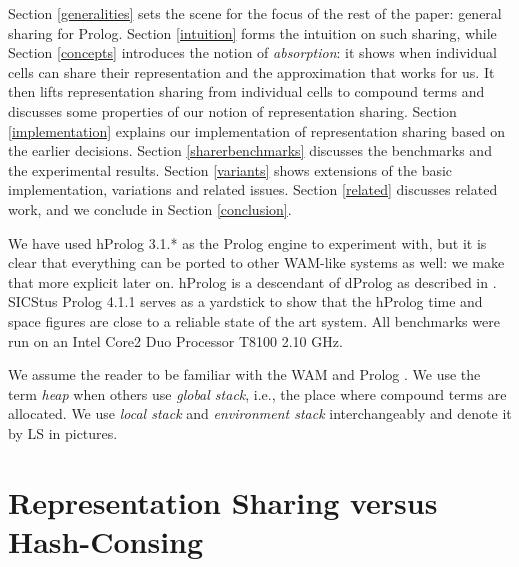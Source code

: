 \documentclass{tlp}
\begin{document}
Section \ref{generalities} sets the scene for the focus of the rest of
the paper: general sharing for Prolog. Section \ref{intuition}
forms the intuition on such sharing, while Section \ref{concepts}
introduces the notion of {\em absorption}: it shows when individual
cells can share their representation and the approximation that works
for us. It then lifts representation sharing from individual cells to
compound terms and discusses some properties of our notion of
representation sharing.
Section \ref{implementation} explains our implementation of
representation sharing based on the earlier decisions.
Section \ref{sharerbenchmarks} discusses the benchmarks and the
experimental results.
Section \ref{variants} shows extensions of the basic implementation,
variations and related issues. Section \ref{related} discusses related
work, and we conclude in Section \ref{conclusion}.



We have used hProlog 3.1.* as the Prolog engine to experiment with,
but it is clear that everything can be ported to other WAM-like
systems as well: we make that more explicit later on. hProlog is a
descendant of dProlog as described in \cite{wamvariations}. SICStus
Prolog 4.1.1 serves as a yardstick to show that the hProlog time and
space figures are close to a reliable state of the art system.
All benchmarks were run on an Intel Core2 Duo Processor T8100 2.10
GHz.

We assume the reader to be familiar with the WAM \cite{wam:hassan,DHWa83}
and Prolog \cite{ClMe84}. We use the term {\em heap} when others use
{\em global stack}, i.e., the place where compound terms are
allocated. We use {\em local stack} and {\em environment stack}
interchangeably and denote it by LS in pictures.

\section{Representation Sharing versus Hash-Consing}\label{repsharversushash}
\end{document}
